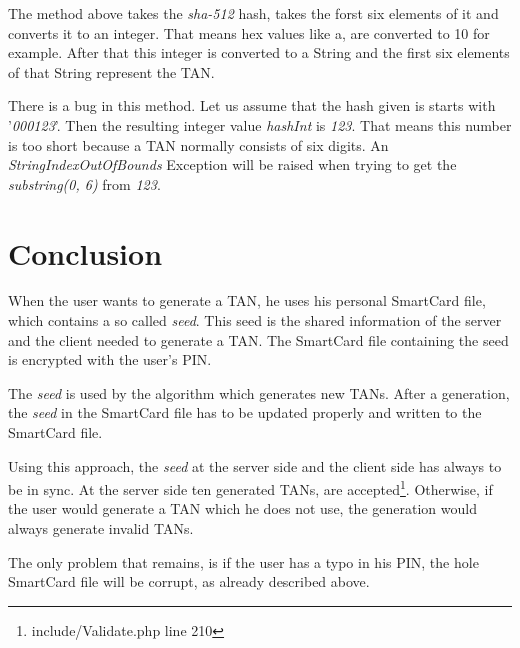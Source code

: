 The method above takes the \textit{sha-512} hash, takes the forst six elements of it and converts it to an integer. That means hex values like a, are converted to 10 for example. After that this integer is converted to a String and the first six elements of that String represent the TAN.

There is a bug in this method. Let us assume that the hash given is starts with '\textit{000123}'. Then the resulting integer value \textit{hashInt} is \textit{123}. That means this number is too short because a TAN normally consists of six digits. An \textit{StringIndexOutOfBounds} Exception will be raised when trying to get the \textit{substring(0, 6)} from \textit{123}.

\section{Conclusion}

When the user wants to generate a TAN, he uses his personal SmartCard file, which contains a so called \textit{seed}. This seed is the shared information of the server and the client needed to generate a TAN. The SmartCard file containing the seed is encrypted with the user's PIN.

The \textit{seed} is used by the algorithm which generates new TANs. After a generation, the \textit{seed} in the SmartCard file has to be updated properly and written to the SmartCard file.

Using this approach, the \textit{seed} at the server side and the client side has always to be in sync. At the server side ten generated TANs, are accepted\footnote{include/Validate.php line 210}. Otherwise, if the user would generate a TAN which he does not use, the generation would always generate invalid TANs.

The only problem that remains, is if the user has a typo in his PIN, the hole SmartCard file will be corrupt, as already described above.